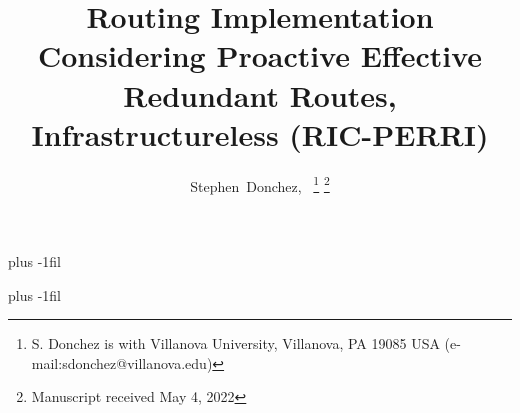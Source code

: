 \documentclass[11pt, journal, onecolumn, letterpaper,]{LaTeX_Assets/IEEETransactions_LaTeX/IEEEtran/IEEEtran}
\begin{document}
    \title{Routing Implementation Considering Proactive Effective Redundant Routes, Infrastructureless (RIC-PERRI)}
    \author{Stephen~Donchez,~%
    \thanks{S. Donchez is with Villanova University, Villanova, PA 19085 USA 
    \mbox{(e-mail:sdonchez@villanova.edu)}}%
    \thanks{Manuscript received May 4, 2022}}%

    \maketitle

    

    

    
    
    

    

    
    

    \vskip 0pt plus -1fil
    
    
    \vskip 0pt plus -1fil
    
\end{document}
